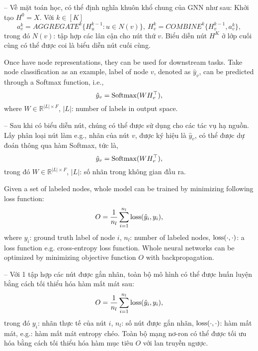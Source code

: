 \documentclass{article}
\begin{document}
\begin{itemize}
\begin{itemize}
\begin{itemize}
            -- Về mặt toán học, có thể định nghĩa khuôn khổ chung của GNN như sau: Khởi tạo $H^0 = X$. Với $k\in[K]$
            \begin{equation*}
                a_v^k = AGGREGATE^k\{H_u^{k-1}:u\in N(v)\},\ H_v^k = COMBINE^k\{H_v^{k-1},a_v^k\},
            \end{equation*}
            trong đó $N(v)$: tập hợp các lân cận cho nút thứ $v$. Biểu diễn nút $H^K$ ở lớp cuối cùng có thể được coi là biểu diễn nút cuối cùng.

            Once have node representations, they can be used for downstream tasks. Take node classification as an example, label of node $v$, denoted as $\hat{y}_v$, can be predicted through a Softmax function, i.e.,
            \begin{equation*}
                \hat{y}_v = {\rm Softmax}(WH_v^\top),
            \end{equation*}
            where $W\in\mathbb{R}^{|L|\times F}$, $|L|$: number of labels in output space.

            -- Sau khi có biểu diễn nút, chúng có thể được sử dụng cho các tác vụ hạ nguồn. Lấy phân loại nút làm e.g., nhãn của nút $v$, được ký hiệu là $\hat{y}_v$, có thể được dự đoán thông qua hàm Softmax, tức là,
            \begin{equation*}
                \hat{y}_v = {\rm Softmax}(WH_v^\top),
            \end{equation*}
            trong đó $W\in\mathbb{R}^{|L|\times F}$, $|L|$: số nhãn trong không gian đầu ra.

            Given a set of labeled nodes, whole model can be trained by minimizing following loss function:
            \begin{equation*}
                O = \frac{1}{n_l}\sum_{i=1}^{n_l} {\rm loss}(\hat{y}_i,y_i),
            \end{equation*}
            where $y_i$: ground truth label of node $i$, $n_l$: number of labeled nodes, ${\rm loss}(\cdot,\cdot)$: a loss function e.g. cross-entropy loss function. Whole neural networks can be optimized by minimizing objective function $O$ with backpropagation.

            -- Với 1 tập hợp các nút được gắn nhãn, toàn bộ mô hình có thể được huấn luyện bằng cách tối thiểu hóa hàm mất mát sau:
            \begin{equation*}
                O = \frac{1}{n_l}\sum_{i=1}^{n_l} {\rm loss}(\hat{y}_i,y_i),
            \end{equation*}
            trong đó $y_i$: nhãn thực tế của nút $i$, $n_l$: số nút được gắn nhãn, ${\rm loss}(\cdot,\cdot)$: hàm mất mát, e.g.: hàm mất mát entropy chéo. Toàn bộ mạng nơ-ron có thể được tối ưu hóa bằng cách tối thiểu hóa hàm mục tiêu $O$ với lan truyền ngược.


\end{itemize}
\end{itemize}
\end{itemize}
\end{document}
